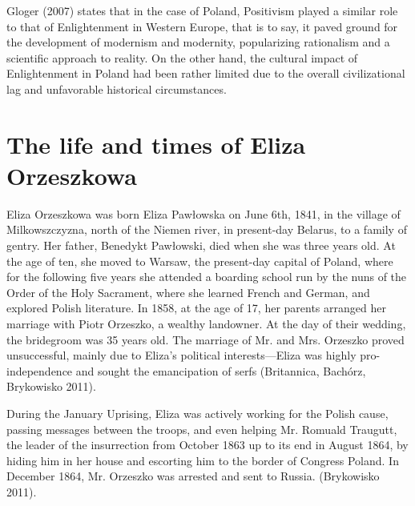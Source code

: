 Gloger (2007) states that in the case of Poland, Positivism played a similar role to that of Enlightenment in Western Europe, that is to say, it paved ground for the development of modernism and modernity, popularizing rationalism and a scientific approach to reality. On the other hand, the cultural impact of Enlightenment in Poland had been rather limited due to the overall civilizational lag and unfavorable historical circumstances.

\section{The life and times of Eliza Orzeszkowa}

Eliza Orzeszkowa was born Eliza Pawłowska on June 6th, 1841, in the village of Milkowszczyzna, north of the Niemen river, in present-day Belarus, to a family of gentry.
Her father, Benedykt Pawłowski, died when she was three years old. 
At the age of ten, she moved to Warsaw, the present-day capital of Poland, where for the following five years she attended a boarding school run by the nuns of the Order of the Holy Sacrament, where she learned French and German, and explored Polish literature.
In 1858, at the age of 17, her parents arranged her marriage with Piotr Orzeszko, a wealthy landowner.
At the day of their wedding, the bridegroom was 35 years old.
The marriage of Mr. and Mrs. Orzeszko proved unsuccessful, mainly due to Eliza's political interests---Eliza was highly pro-independence and sought the emancipation of serfs (Britannica, Bachórz, Brykowisko 2011).

During the January Uprising, Eliza was actively working for the Polish cause, passing messages between the troops, and even helping Mr. Romuald Traugutt, the leader of the insurrection from October 1863 up to its end in August 1864, by hiding him in her house and escorting him to the border of Congress Poland.
In December 1864, Mr. Orzeszko was arrested and sent to Russia.
(Brykowisko 2011).

